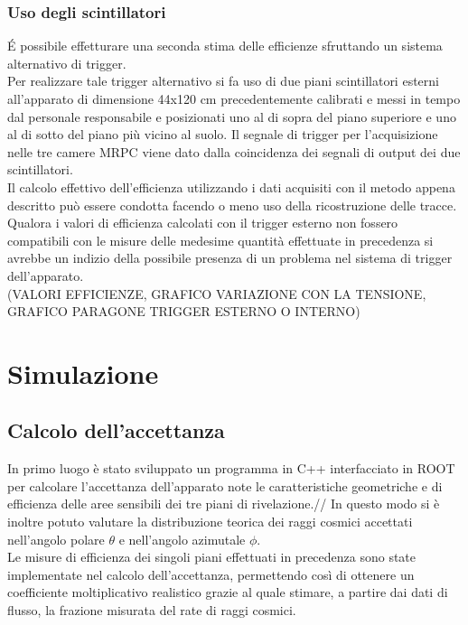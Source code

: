 \documentclass[8pt]{extarticle}
\begin{document}
\subsubsection{Uso degli scintillatori}
\'E possibile effetturare una seconda stima delle efficienze sfruttando un sistema alternativo di trigger. \\
Per realizzare tale trigger alternativo si fa uso di due piani scintillatori esterni all'apparato di dimensione 44x120 cm precedentemente calibrati e messi in tempo dal personale responsabile e posizionati uno al di sopra del piano superiore e uno al di sotto del piano più vicino al suolo. Il segnale di trigger per l'acquisizione nelle tre camere  MRPC viene dato dalla coincidenza dei segnali di output dei due scintillatori. \\
Il calcolo effettivo dell'efficienza utilizzando i dati acquisiti con il metodo appena descritto può essere condotta facendo o meno uso della ricostruzione delle tracce.
Qualora i valori di efficienza calcolati con il trigger esterno non fossero compatibili con le misure delle medesime quantità effettuate in precedenza si avrebbe un indizio della possibile presenza di un problema nel sistema di trigger dell'apparato.\\
(VALORI EFFICIENZE, GRAFICO VARIAZIONE CON LA TENSIONE, GRAFICO PARAGONE TRIGGER ESTERNO O INTERNO)

\section{Simulazione}

\subsection{Calcolo dell'accettanza}
In primo luogo è stato sviluppato un programma in C++ interfacciato in ROOT per calcolare l’accettanza dell’apparato note le caratteristiche geometriche e di efficienza delle aree sensibili dei tre piani di rivelazione.//
In questo modo si è inoltre potuto valutare la distribuzione teorica dei raggi cosmici accettati nell’angolo polare $\theta$ e nell’angolo azimutale $\phi$. \\
Le misure di efficienza dei singoli piani effettuati in precedenza sono state implementate nel calcolo dell'accettanza, permettendo così di ottenere un coefficiente moltiplicativo realistico grazie al quale stimare, a partire dai dati di flusso, la frazione misurata del rate di raggi cosmici.
\end{document}
